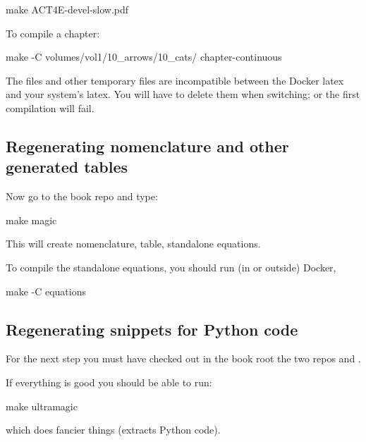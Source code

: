 \begin{console}
    make ACT4E-devel-slow.pdf
\end{console}

To compile a chapter:

\begin{console}
    make -C volumes/vol1/10_arrows/10_cats/ chapter-continuous
\end{console}

\begin{remark}
    The  files and other temporary files are incompatible between the Docker latex and your system's latex. You will have to delete them when switching; or the first compilation will fail.
\end{remark}

\subsection{Regenerating nomenclature and other generated tables}


Now go to the book repo and type:

\begin{console}
    make magic
\end{console}

This will create nomenclature, table, standalone equations.

To compile the standalone equations, you should run (in or outside) Docker,

\begin{console}
    make -C equations
\end{console}

\subsection{Regenerating snippets for Python code}


For the next step you must have checked out in the book root the two repos
 and .


If everything is good you should be able to run:
\begin{console}
    make ultramagic
\end{console}
which does fancier things (extracts Python code).


%
%
%
%
%
%


